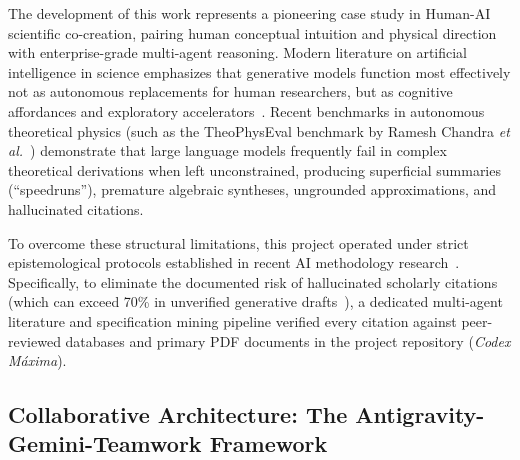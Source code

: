 \documentclass[11pt,a4paper]{article}
\begin{document}
The development of this work represents a pioneering case study in Human-AI scientific co-creation, pairing human conceptual intuition and physical direction with enterprise-grade multi-agent reasoning. Modern literature on artificial intelligence in science emphasizes that generative models function most effectively not as autonomous replacements for human researchers, but as cognitive affordances and exploratory accelerators~\cite{OToole2024,VillaescusaNavarro2026}. Recent benchmarks in autonomous theoretical physics (such as the TheoPhysEval benchmark by Ramesh Chandra \emph{et al.}~\cite{Chandra2026TheoPhysEval}) demonstrate that large language models frequently fail in complex theoretical derivations when left unconstrained, producing superficial summaries (``speedruns''), premature algebraic syntheses, ungrounded approximations, and hallucinated citations.

To overcome these structural limitations, this project operated under strict epistemological protocols established in recent AI methodology research~\cite{Jauhiainen2026,Haber2025,Kacena2024}. Specifically, to eliminate the documented risk of hallucinated scholarly citations (which can exceed 70\% in unverified generative drafts~\cite{Kacena2024}), a dedicated multi-agent literature and specification mining pipeline verified every citation against peer-reviewed databases and primary PDF documents in the project repository (\emph{Codex Máxima}).

\subsection{Collaborative Architecture: The Antigravity-Gemini-Teamwork Framework}
\end{document}
